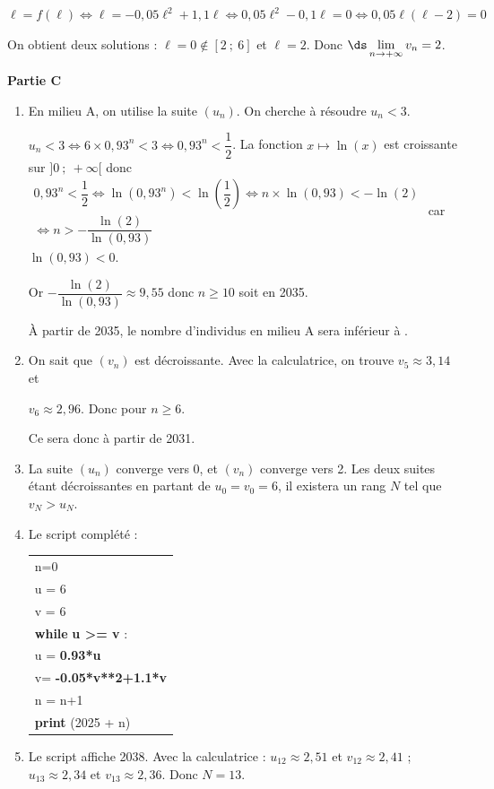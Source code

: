 \begin{enumerate}[resume]
\begin{enumerate}
		$\ell=f(\ell) \iff \ell=-0,05\ell^2+1,1\ell \iff 0,05\ell^2-0,1 \ell=0 \iff 0,05\ell(\ell-2)=0$
		
		On obtient deux solutions : $\ell=0 \notin [2~;~6]$ et $\ell=2$. Donc $\ds \lim\limits_{n \to +\infty} v_n=2$.
	\end{enumerate}
\end{enumerate}

\bigskip

\textbf{Partie C}

\medskip

\begin{enumerate}
	\item En milieu A, on utilise la suite $(u_n)$. On cherche à résoudre $u_n<3$.
	
	$u_n<3 \iff 6\times 0,93^n<3 \iff 0,93^n <\dfrac{1}{2}$. La fonction $x\mapsto \ln(x)$ est croissante sur $]0~;~+\infty[$ donc $\begin{gathered}0,93^n <\dfrac{1}{2} \iff \ln\left(0,93^n\right)<\ln\left(\dfrac{1}{2} \right) \iff n \times \ln(0,93) <-\ln(2)\\ \iff n>-\dfrac{\ln(2)}{\ln(0,93)}\end{gathered}$ car $\ln(0,93) < 0$.
	
Or $-\dfrac{\ln(2)}{\ln(0,93)}\approx 9,55$ donc $n\geqslant 10$ soit en 2035.

À partir de 2035, le nombre d'individus en milieu A sera inférieur à .
	\item On sait que $(v_n)$ est décroissante. Avec la calculatrice, on trouve $v_5\approx 3,14$ et 
	
$v_6\approx 2,96$. Donc pour $n\geqslant 6$.
	
Ce sera donc à partir de 2031.
	\item La suite $(u_n)$ converge vers 0, et $(v_n)$ converge vers 2. Les deux suites étant décroissantes en partant de $u_0 = v_0=6$, il existera un rang $N$ tel que $v_N > u_N$.
	\item Le script complété :
	\begin{center}
		\begin{tabular}{|l|}\hline
			n=0 \\
			u = 6\\
			v = 6 \\
			\textbf{while} \textbf{u >= v} :\\
			\qquad u = \textbf{0.93*u}\\
			\qquad v= \textbf{-0.05*v**2+1.1*v}\\
			\qquad n = n+1\\
			\textbf{print} (2025 + n)\\ \hline
		\end{tabular}
	\end{center}
	\item Le script affiche 2038. Avec la calculatrice : $u_{12} \approx 2,51$ et $v_{12}\approx 2,41$ ; $u_{13} \approx 2,34$ et $v_{13}\approx 2,36$. Donc $N = 13$.
\end{enumerate}
